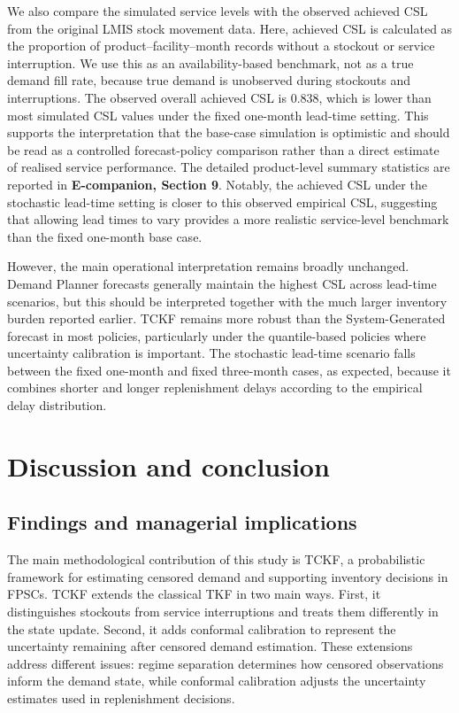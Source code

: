 \documentclass[
  11pt,
  authoryear,
  doubleblind,
  3p]{elsarticle}
\begin{document}
We also compare the simulated service levels with the observed achieved
CSL from the original LMIS stock movement data. Here, achieved CSL is
calculated as the proportion of product--facility--month records without
a stockout or service interruption. We use this as an availability-based
benchmark, not as a true demand fill rate, because true demand is
unobserved during stockouts and interruptions. The observed overall
achieved CSL is 0.838, which is lower than most simulated CSL values
under the fixed one-month lead-time setting. This supports the
interpretation that the base-case simulation is optimistic and should be
read as a controlled forecast-policy comparison rather than a direct
estimate of realised service performance. The detailed product-level
summary statistics are reported in \textbf{E-companion, Section 9}.
Notably, the achieved CSL under the stochastic lead-time setting is
closer to this observed empirical CSL, suggesting that allowing lead
times to vary provides a more realistic service-level benchmark than the
fixed one-month base case.

However, the main operational interpretation remains broadly unchanged.
Demand Planner forecasts generally maintain the highest CSL across
lead-time scenarios, but this should be interpreted together with the
much larger inventory burden reported earlier. TCKF remains more robust
than the System-Generated forecast in most policies, particularly under
the quantile-based policies where uncertainty calibration is important.
The stochastic lead-time scenario falls between the fixed one-month and
fixed three-month cases, as expected, because it combines shorter and
longer replenishment delays according to the empirical delay
distribution.

\section{Discussion and conclusion}\label{sec-discussion_wp2}

\subsection{Findings and managerial
implications}\label{findings-and-managerial-implications}

The main methodological contribution of this study is TCKF, a
probabilistic framework for estimating censored demand and supporting
inventory decisions in FPSCs. TCKF extends the classical TKF in two main
ways. First, it distinguishes stockouts from service interruptions and
treats them differently in the state update. Second, it adds conformal
calibration to represent the uncertainty remaining after censored demand
estimation. These extensions address different issues: regime separation
determines how censored observations inform the demand state, while
conformal calibration adjusts the uncertainty estimates used in
replenishment decisions.
\end{document}
